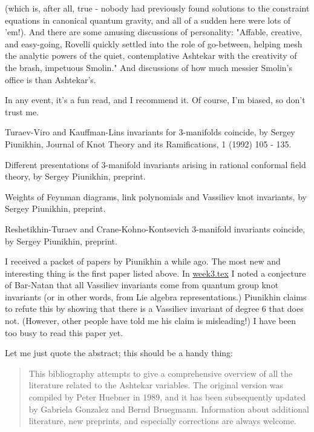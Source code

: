 (which is, after all, true - nobody had previously found solutions to the constraint equations in canonical quantum gravity, and all of a sudden here were lots of 'em!). And there are some amusing discussions of personality: "Affable, creative, and easy-going, Rovelli quickly settled into the role of go-between, helping mesh the analytic powers of the quiet, contemplative Ashtekar with the creativity of the brash, impetuous Smolin." And discussions of how much messier Smolin's office is than Ashtekar's.

In any event, it's a fun read, and I recommend it. Of course, I'm biased, so don't trust me.


Turaev-Viro and Kauffman-Lins invariants for 3-manifolds coincide, by Sergey Piunikhin, Journal of Knot Theory and its Ramifications, 1 (1992) 105 - 135.

Different presentations of 3-manifold invariants arising in rational conformal field theory, by Sergey Piunikhin, preprint.

Weights of Feynman diagrams, link polynomials and Vassiliev knot invariants, by Sergey Piunikhin, preprint.

Reshetikhin-Turaev and Crane-Kohno-Kontsevich 3-manifold invariants coincide, by Sergey Piunikhin, preprint.

I received a packet of papers by Piunikhin a while ago. The most new and interesting thing is the first paper listed above. In {\hyperref[week3]{week3.tex}} I noted a conjecture of Bar-Natan that all Vassiliev invariants come from quantum group knot invariants (or in other words, from Lie algebra representations.) Piunikhin claims to refute this by showing that there is a Vassiliev invariant of degree 6 that does not. (However, other people have told me his claim is misleading!) I have been too busy to read this paper yet.


Let me just quote the abstract; this should be a handy thing:

\begin{quote}
    This bibliography attempts to give a comprehensive overview of all the literature related to the Ashtekar variables. The original version was compiled by Peter Huebner in 1989, and it has been subsequently updated by Gabriela Gonzalez and Bernd Bruegmann. Information about additional literature, new preprints, and especially corrections are always welcome.
\end{quote}

